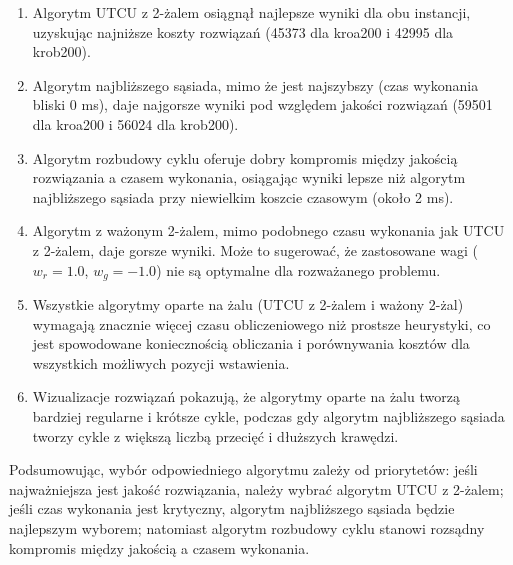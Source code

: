 \documentclass[12pt,a4paper]{article}
\begin{document}
\begin{enumerate}
    \item Algorytm UTCU z 2-żalem osiągnął najlepsze wyniki dla obu instancji, uzyskując najniższe koszty rozwiązań (45373 dla kroa200 i 42995 dla krob200).
    
    \item Algorytm najbliższego sąsiada, mimo że jest najszybszy (czas wykonania bliski 0 ms), daje najgorsze wyniki pod względem jakości rozwiązań (59501 dla kroa200 i 56024 dla krob200).
    
    \item Algorytm rozbudowy cyklu oferuje dobry kompromis między jakością rozwiązania a czasem wykonania, osiągając wyniki lepsze niż algorytm najbliższego sąsiada przy niewielkim koszcie czasowym (około 2 ms).
    
    \item Algorytm z ważonym 2-żalem, mimo podobnego czasu wykonania jak UTCU z 2-żalem, daje gorsze wyniki. Może to sugerować, że zastosowane wagi ($w_r = 1.0$, $w_g = -1.0$) nie są optymalne dla rozważanego problemu.
    
    \item Wszystkie algorytmy oparte na żalu (UTCU z 2-żalem i ważony 2-żal) wymagają znacznie więcej czasu obliczeniowego niż prostsze heurystyki, co jest spowodowane koniecznością obliczania i porównywania kosztów dla wszystkich możliwych pozycji wstawienia.
    
    \item Wizualizacje rozwiązań pokazują, że algorytmy oparte na żalu tworzą bardziej regularne i krótsze cykle, podczas gdy algorytm najbliższego sąsiada tworzy cykle z większą liczbą przecięć i dłuższych krawędzi.
\end{enumerate}

Podsumowując, wybór odpowiedniego algorytmu zależy od priorytetów: jeśli najważniejsza jest jakość rozwiązania, należy wybrać algorytm UTCU z 2-żalem; jeśli czas wykonania jest krytyczny, algorytm najbliższego sąsiada będzie najlepszym wyborem; natomiast algorytm rozbudowy cyklu stanowi rozsądny kompromis między jakością a czasem wykonania.
\end{document}

